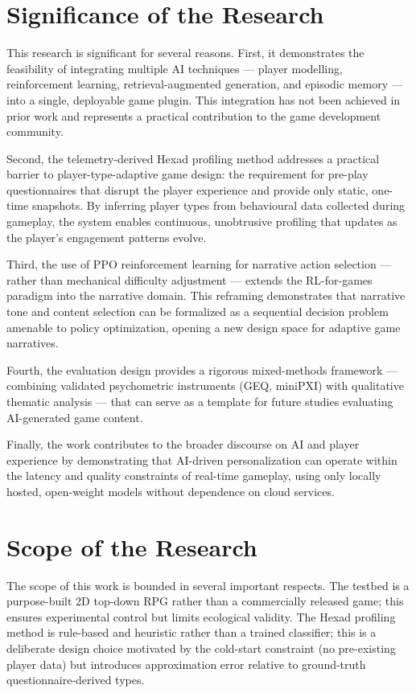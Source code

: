 \documentclass[12pt,a4paper]{report}
\begin{document}
\section{Significance of the Research}

This research is significant for several reasons. First, it demonstrates the feasibility of integrating multiple AI techniques --- player modelling, reinforcement learning, retrieval-augmented generation, and episodic memory --- into a single, deployable game plugin. This integration has not been achieved in prior work and represents a practical contribution to the game development community.

Second, the telemetry-derived Hexad profiling method addresses a practical barrier to player-type-adaptive game design: the requirement for pre-play questionnaires that disrupt the player experience and provide only static, one-time snapshots. By inferring player types from behavioural data collected during gameplay, the system enables continuous, unobtrusive profiling that updates as the player's engagement patterns evolve.

Third, the use of PPO reinforcement learning for narrative action selection --- rather than mechanical difficulty adjustment --- extends the RL-for-games paradigm into the narrative domain. This reframing demonstrates that narrative tone and content selection can be formalized as a sequential decision problem amenable to policy optimization, opening a new design space for adaptive game narratives.

Fourth, the evaluation design provides a rigorous mixed-methods framework --- combining validated psychometric instruments (GEQ, miniPXI) with qualitative thematic analysis --- that can serve as a template for future studies evaluating AI-generated game content.

Finally, the work contributes to the broader discourse on AI and player experience by demonstrating that AI-driven personalization can operate within the latency and quality constraints of real-time gameplay, using only locally hosted, open-weight models without dependence on cloud services.

\section{Scope of the Research}

The scope of this work is bounded in several important respects. The testbed is a purpose-built 2D top-down RPG rather than a commercially released game; this ensures experimental control but limits ecological validity. The Hexad profiling method is rule-based and heuristic rather than a trained classifier; this is a deliberate design choice motivated by the cold-start constraint (no pre-existing player data) but introduces approximation error relative to ground-truth questionnaire-derived types.
\end{document}
